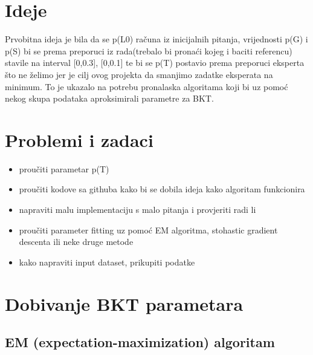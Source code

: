 \section{Ideje}
Prvobitna ideja je bila da se p(L0) računa iz inicijalnih pitanja, vrijednosti p(G) i p(S) bi se prema preporuci iz rada(trebalo bi pronaći kojeg i baciti referencu) stavile na interval [0,0.3], [0,0.1] te bi se p(T) postavio prema preporuci eksperta što ne želimo jer je cilj ovog projekta da smanjimo zadatke eksperata na minimum.\newline
To je ukazalo na potrebu pronalaska algoritama koji bi uz pomoć nekog skupa podataka aproksimirali parametre za BKT.
\section{Problemi i zadaci}
\begin{itemize}
	\item proučiti parametar p(T)
	\item proučiti kodove sa githuba kako bi se dobila ideja kako algoritam funkcionira
	\item napraviti malu implementaciju s malo pitanja i provjeriti radi li
	\item proučiti parameter fitting uz pomoć EM algoritma, stohastic gradient descenta ili neke druge metode
	\item kako napraviti input dataset, prikupiti podatke
	
	
\end{itemize}
\section{Dobivanje BKT parametara}
\subsection{EM (expectation-maximization) algoritam}

